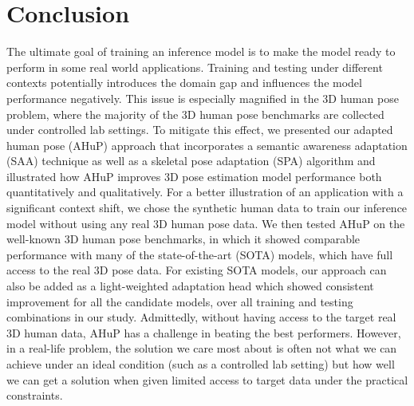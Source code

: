 \documentclass[twocolumn]{svjour3}          \smartqed  \usepackage{graphicx}
\begin{document}
\section{Conclusion}
The ultimate goal of training an inference model is to make the model ready to perform in some real world applications. Training and testing under different contexts  potentially introduces the domain gap and influences the model performance negatively. This issue is especially magnified in the  3D human pose problem, where the majority of the 3D human pose benchmarks are collected under controlled lab settings. 
To mitigate this effect, we presented our adapted human pose (AHuP) approach that incorporates a semantic awareness adaptation (SAA) technique as well as a skeletal pose adaptation (SPA) algorithm and illustrated how AHuP improves 3D pose estimation model performance both quantitatively and qualitatively. 
For a better illustration of an application with a significant context shift, we chose the synthetic human data to train our inference model without using any real 3D human pose data. We then  tested AHuP on the well-known  3D human pose benchmarks, in which it  showed comparable performance with many of the state-of-the-art (SOTA) models, which have full access to the real 3D pose data.
For existing SOTA models, our approach can  also be added as a light-weighted adaptation head which showed consistent improvement for all the candidate models, over all training and testing combinations in our study.   
Admittedly, without having access to the target real 3D human data, AHuP has a challenge in beating the best performers. However,  in a real-life problem, the  solution we care most about is often not what we can achieve under an ideal  condition (such as a controlled lab setting) but how well we can get a solution when given limited access to target data under the practical constraints. 










\end{document}
